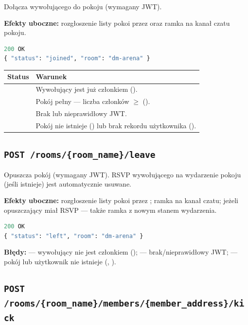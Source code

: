 Dołącza wywołującego do pokoju (wymagany JWT).

\textbf{Efekty uboczne:} rozgłoszenie listy pokoi przez  oraz ramka 
na kanał czatu pokoju.

\begin{lstlisting}[language=Python]
200 OK
{ "status": "joined", "room": "dm-arena" }
\end{lstlisting}

\begin{tabularx}{\textwidth}{lY}
\toprule
Status & Warunek \\
\midrule
{} & Wywołujący jest już członkiem (). \\
 & Pokój pełny --- liczba członków $\geq$  (). \\
 & Brak lub nieprawidłowy JWT. \\
 & Pokój nie istnieje () lub brak rekordu użytkownika (). \\
\bottomrule
\end{tabularx}

\subsection{\texttt{POST /rooms/\{room\_name\}/leave}}

Opuszcza pokój (wymagany JWT). RSVP wywołującego na wydarzenie pokoju (jeśli istnieje) jest
automatycznie usuwane.

\textbf{Efekty uboczne:} rozgłoszenie listy pokoi przez ; ramka 
na kanał czatu; jeżeli opuszczający miał RSVP --- także ramka  z nowym stanem wydarzenia.

\begin{lstlisting}[language=Python]
200 OK
{ "status": "left", "room": "dm-arena" }
\end{lstlisting}

\textbf{Błędy:}  --- wywołujący nie jest członkiem ();
 --- brak/nieprawidłowy JWT;  --- pokój lub użytkownik nie istnieje
(, ).

\subsection{\texttt{POST /rooms/\{room\_name\}/members/\{member\_address\}/kick}}

